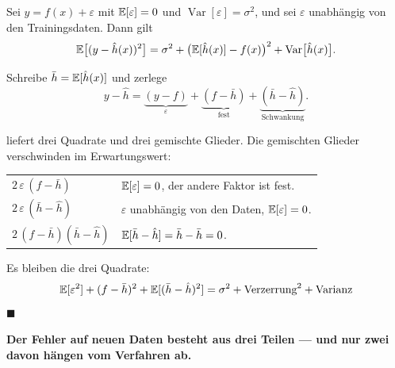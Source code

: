 \begin{merksatz}
Sei $y = f(x) + \varepsilon$ mit $\mathbb{E}[\varepsilon] = 0$ und $\operatorname{Var}[\varepsilon] = \sigma^{2}$, und sei $\varepsilon$ unabhängig von den Trainingsdaten. Dann gilt
\[ \mathbb{E}\bigl[(y - \hat h(x))^{2}\bigr] = \sigma^{2} + \bigl(\mathbb{E}[\hat h(x)] - f(x)\bigr)^{2} + \operatorname{Var}\bigl[\hat h(x)\bigr] . \]

Schreibe $\bar h = \mathbb{E}[\hat h(x)]$ und zerlege
\[ y - \hat h = \underbrace{(y-f)}_{\varepsilon} + \underbrace{(f-\bar h)}_{\text{fest}} + \underbrace{(\bar h-\hat h)}_{\text{Schwankung}} . \]

 liefert drei Quadrate und drei gemischte Glieder. Die gemischten Glieder verschwinden im Erwartungswert:

\begin{center}
{\small
\renewcommand{\arraystretch}{1.5}
\begin{tabular}{@{}P{3.0cm}P{5.6cm}@{}}
\toprule
$2\,\varepsilon\,(f-\bar h)$ & $\mathbb{E}[\varepsilon] = 0$, der andere Faktor ist fest.\\
$2\,\varepsilon\,(\bar h-\hat h)$ & $\varepsilon$ unabhängig von den Daten, $\mathbb{E}[\varepsilon]=0$.\\
$2\,(f-\bar h)(\bar h-\hat h)$ & $\mathbb{E}[\bar h-\hat h] = \bar h - \bar h = 0$.\\
\bottomrule
\end{tabular}}
\end{center}

Es bleiben die drei Quadrate:
\[ \mathbb{E}[\varepsilon^{2}] + (f-\bar h)^{2} + \mathbb{E}[(\bar h-\hat h)^{2}] = \sigma^{2} + \text{Verzerrung}^{2} + \text{Varianz} \]
$\blacksquare$

\begin{center}
\begin{minipage}{0.9\textwidth}
\textbf{Der Fehler auf neuen Daten besteht aus drei Teilen --- und nur zwei davon hängen vom Verfahren ab.}
\end{minipage}
\end{center}
\end{merksatz}

